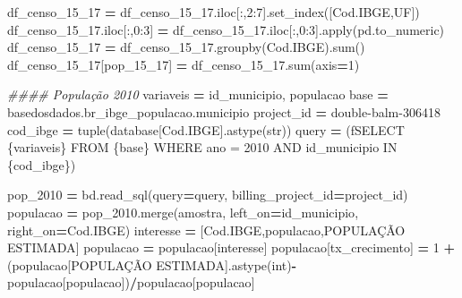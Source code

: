 \documentclass[
  12,
  dvipsnames]{article}
\newenvironment{Shaded}{\begin{snugshade}}{\end{snugshade}}
\newcommand{\BuiltInTok}[1]{#1}
\newcommand{\CommentTok}[1]{\textcolor[rgb]{0.56,0.35,0.01}{\textit{#1}}}
\newcommand{\DecValTok}[1]{\textcolor[rgb]{0.00,0.00,0.81}{#1}}
\newcommand{\NormalTok}[1]{#1}
\newcommand{\OperatorTok}[1]{\textcolor[rgb]{0.81,0.36,0.00}{\textbf{#1}}}
\newcommand{\SpecialCharTok}[1]{\textcolor[rgb]{0.00,0.00,0.00}{#1}}
\newcommand{\SpecialStringTok}[1]{\textcolor[rgb]{0.31,0.60,0.02}{#1}}
\newcommand{\StringTok}[1]{\textcolor[rgb]{0.31,0.60,0.02}{#1}}
\begin{document}
\begin{Shaded}
\begin{Highlighting}[]
\NormalTok{df\_censo\_15\_17 }\OperatorTok{=}\NormalTok{ df\_censo\_15\_17.iloc[:,}\DecValTok{2}\NormalTok{:}\DecValTok{7}\NormalTok{].set\_index([}\StringTok{\textquotesingle{}Cod.IBGE\textquotesingle{}}\NormalTok{,}\StringTok{\textquotesingle{}UF\textquotesingle{}}\NormalTok{])}
\NormalTok{df\_censo\_15\_17.iloc[:,}\DecValTok{0}\NormalTok{:}\DecValTok{3}\NormalTok{] }\OperatorTok{=}\NormalTok{ df\_censo\_15\_17.iloc[:,}\DecValTok{0}\NormalTok{:}\DecValTok{3}\NormalTok{].}\BuiltInTok{apply}\NormalTok{(pd.to\_numeric)}
\NormalTok{df\_censo\_15\_17 }\OperatorTok{=}\NormalTok{ df\_censo\_15\_17.groupby(}\StringTok{\textquotesingle{}Cod.IBGE\textquotesingle{}}\NormalTok{).}\BuiltInTok{sum}\NormalTok{()}
\NormalTok{df\_censo\_15\_17[}\StringTok{\textquotesingle{}pop\_15\_17\textquotesingle{}}\NormalTok{] }\OperatorTok{=}\NormalTok{ df\_censo\_15\_17.}\BuiltInTok{sum}\NormalTok{(axis}\OperatorTok{=}\DecValTok{1}\NormalTok{)}

\CommentTok{\#\#\#\# População 2010}
\NormalTok{variaveis }\OperatorTok{=} \StringTok{\textquotesingle{}id\_municipio, populacao\textquotesingle{}}
\NormalTok{base }\OperatorTok{=} \StringTok{\textquotesingle{}\textasciigrave{}basedosdados.br\_ibge\_populacao.municipio\textasciigrave{}\textquotesingle{}}
\NormalTok{project\_id }\OperatorTok{=} \StringTok{\textquotesingle{}double{-}balm{-}306418\textquotesingle{}}
\NormalTok{cod\_ibge }\OperatorTok{=} \BuiltInTok{tuple}\NormalTok{(database[}\StringTok{\textquotesingle{}Cod.IBGE\textquotesingle{}}\NormalTok{].astype(}\BuiltInTok{str}\NormalTok{))}
\NormalTok{query }\OperatorTok{=}\NormalTok{ (}\SpecialStringTok{f\textquotesingle{}SELECT }\SpecialCharTok{\{}\NormalTok{variaveis}\SpecialCharTok{\}}\SpecialStringTok{ FROM }\SpecialCharTok{\{}\NormalTok{base}\SpecialCharTok{\}}\SpecialStringTok{ WHERE ano = 2010 AND id\_municipio IN }\SpecialCharTok{\{}\NormalTok{cod\_ibge}\SpecialCharTok{\}}\SpecialStringTok{\textquotesingle{}}\NormalTok{)}

\NormalTok{pop\_2010 }\OperatorTok{=}\NormalTok{ bd.read\_sql(query}\OperatorTok{=}\NormalTok{query, billing\_project\_id}\OperatorTok{=}\NormalTok{project\_id)}
\NormalTok{populacao }\OperatorTok{=}\NormalTok{ pop\_2010.merge(amostra, left\_on}\OperatorTok{=}\StringTok{\textquotesingle{}id\_municipio\textquotesingle{}}\NormalTok{, right\_on}\OperatorTok{=}\StringTok{\textquotesingle{}Cod.IBGE\textquotesingle{}}\NormalTok{)}
\NormalTok{interesse }\OperatorTok{=}\NormalTok{ [}\StringTok{\textquotesingle{}Cod.IBGE\textquotesingle{}}\NormalTok{,}\StringTok{\textquotesingle{}populacao\textquotesingle{}}\NormalTok{,}\StringTok{\textquotesingle{}POPULAÇÃO ESTIMADA\textquotesingle{}}\NormalTok{]}
\NormalTok{populacao }\OperatorTok{=}\NormalTok{ populacao[interesse]}
\NormalTok{populacao[}\StringTok{\textquotesingle{}tx\_crecimento\textquotesingle{}}\NormalTok{] }\OperatorTok{=} \DecValTok{1} \OperatorTok{+}\NormalTok{ (populacao[}\StringTok{\textquotesingle{}POPULAÇÃO ESTIMADA\textquotesingle{}}\NormalTok{].astype(}\BuiltInTok{int}\NormalTok{)}\OperatorTok{{-}}\NormalTok{populacao[}\StringTok{\textquotesingle{}populacao\textquotesingle{}}\NormalTok{])}\OperatorTok{/}\NormalTok{populacao[}\StringTok{\textquotesingle{}populacao\textquotesingle{}}\NormalTok{]}


\end{Highlighting}
\end{Shaded}
\end{document}
